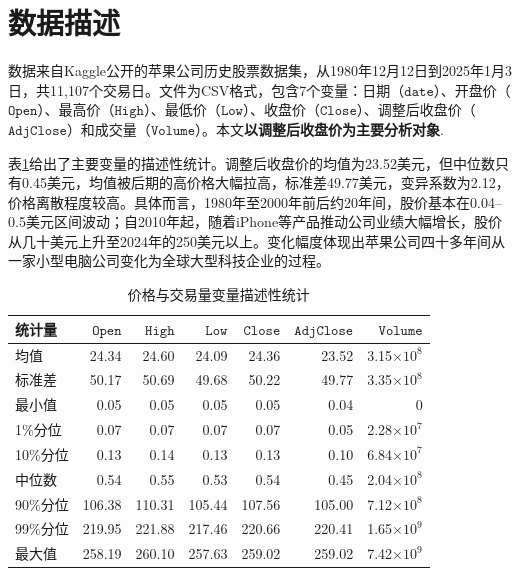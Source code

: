 \documentclass[10pt, a4paper]{ctexart}
\theoremstyle{definition}
\numberwithin{equation}{section}
\numberwithin{figure}{section}
\numberwithin{table}{section}
\begin{document}
\section{数据描述}

数据来自Kaggle公开的苹果公司历史股票数据集，从1980年12月12日到2025年1月3日，共11,107个交易日。文件为CSV格式，包含7个变量：日期（$\mathtt{date}$）、开盘价（$\mathtt{Open}$）、最高价（$\mathtt{High}$）、最低价（$\mathtt{Low}$）、收盘价（$\mathtt{Close}$）、调整后收盘价（$\mathtt{Adj Close}$）和成交量（$\mathtt{Volume}$）。本文\textbf{以调整后收盘价为主要分析对象}.

表\ref{tab:desc}给出了主要变量的描述性统计。调整后收盘价的均值为23.52美元，但中位数只有0.45美元，均值被后期的高价格大幅拉高，标准差49.77美元，变异系数为2.12，价格离散程度较高。具体而言，1980年至2000年前后约20年间，股价基本在0.04–0.5美元区间波动；自2010年起，随着iPhone等产品推动公司业绩大幅增长，股价从几十美元上升至2024年的250美元以上。变化幅度体现出苹果公司四十多年间从一家小型电脑公司变化为全球大型科技企业的过程。

\begin{table}[H]
\centering
\caption{价格与交易量变量描述性统计}
\label{tab:desc}
\begin{tabular}{lrrrrrr}
\toprule
统计量 & $\mathtt{Open}$ & $\mathtt{High}$ & $\mathtt{Low}$ & $\mathtt{Close}$ & $\mathtt{Adj Close}$ & $\mathtt{Volume}$\\
\midrule
均值 & 24.34 & 24.60 & 24.09 & 24.36 & 23.52 & 3.15$\times 10^8$ \\
标准差 & 50.17 & 50.69 & 49.68 & 50.22 & 49.77 & 3.35$\times10^8$ \\
最小值 & 0.05 & 0.05 & 0.05 & 0.05 & 0.04 & 0 \\
1\%分位 & 0.07 & 0.07 & 0.07 & 0.07 & 0.05 & 2.28$\times10^7$ \\
10\%分位 & 0.13 & 0.14 & 0.13 & 0.13 & 0.10 & 6.84$\times10^7$ \\
中位数 & 0.54 & 0.55 & 0.53 & 0.54 & 0.45 & 2.04$\times10^8$ \\
90\%分位 & 106.38 & 110.31 & 105.44 & 107.56 & 105.00 & 7.12$\times10^8$ \\
99\%分位 & 219.95 & 221.88 & 217.46 & 220.66 & 220.41 & 1.65$\times10^9$ \\
最大值 & 258.19 & 260.10 & 257.63 & 259.02 & 259.02 & 7.42$\times10^9$ \\
\bottomrule
\end{tabular}
\end{table}
\end{document}

